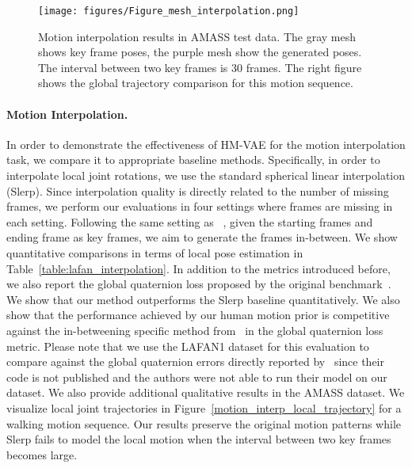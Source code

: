 \begin{figure}[t!]
\vspace{-2mm}
\begin{center}   \texttt{[image: figures/Figure\_mesh\_interpolation.png]}
\end{center}
\vspace{-5mm}
\caption{Motion interpolation results in AMASS test data. The gray mesh shows key frame poses, the purple mesh show the generated poses. The interval between two key frames is 30 frames. The right figure shows the global trajectory comparison for this motion sequence.}
\label{motion_interp_mesh_vis}
\vspace{-4mm}
\end{figure}

\vspace{-4mm}
\paragraph{Motion Interpolation.}
In order to demonstrate the effectiveness of HM-VAE for the motion interpolation task, we compare it to appropriate baseline methods. Specifically, in order to interpolate local joint rotations, we use the standard spherical linear interpolation (Slerp). Since interpolation quality is directly related to the number of missing frames, we perform our evaluations in four settings where  frames are missing in each setting. Following the same setting as ~\cite{harvey2020robust}, given the starting  frames and ending  frame as key frames, we aim to generate the frames in-between. We show quantitative comparisons in terms of local pose estimation in Table~\ref{table:lafan_interpolation}. In addition to the metrics introduced before, we also report the global quaternion loss proposed by the original benchmark~\cite{harvey2020robust}. We show that our method outperforms the Slerp baseline quantitatively.
We also show that the performance achieved by our human motion prior is competitive against the in-betweening specific method from~\cite{harvey2020robust} in the global quaternion loss metric.
Please note that we use the LAFAN1 dataset for this evaluation to compare against the global quaternion errors directly reported by~\cite{harvey2020robust} since their code is not published and the authors were not able to run their model on our dataset.  
We also provide additional qualitative results in the AMASS dataset. We visualize local joint trajectories in Figure~\ref{motion_interp_local_trajectory} for a walking motion sequence.
Our results preserve the original motion patterns while Slerp fails to model the local motion when the interval between two key frames becomes large.
